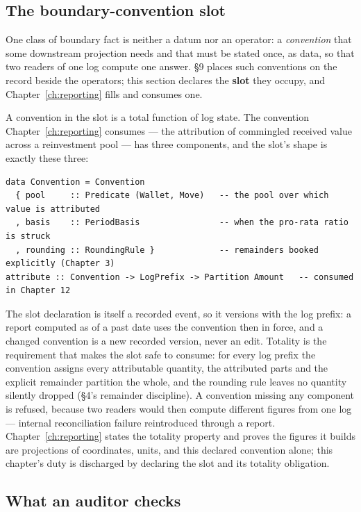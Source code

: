 \subsection{The boundary-convention slot}\label{sec:slot}

One class of boundary fact is neither a datum nor an operator: a \emph{convention} that
some downstream projection needs and that must be stated once, as data, so that two readers
of one log compute one answer. \S 9 places such conventions on the record beside the
operators; this section declares the \textbf{slot} they occupy, and
Chapter~\ref{ch:reporting} fills and consumes one.

A convention in the slot is a total function of log state. The convention
Chapter~\ref{ch:reporting} consumes --- the attribution of commingled received value across
a reinvestment pool --- has three components, and the slot's shape is exactly these three:

\begin{lstlisting}
data Convention = Convention
  { pool     :: Predicate (Wallet, Move)   -- the pool over which value is attributed
  , basis    :: PeriodBasis                -- when the pro-rata ratio is struck
  , rounding :: RoundingRule }             -- remainders booked explicitly (Chapter 3)
attribute :: Convention -> LogPrefix -> Partition Amount   -- consumed in Chapter 12
\end{lstlisting}

The slot declaration is itself a recorded event, so it versions with the log prefix: a
report computed as of a past date uses the convention then in force, and a changed
convention is a new recorded version, never an edit. Totality is the requirement that makes
the slot safe to consume: for every log prefix the convention assigns every attributable
quantity, the attributed parts and the explicit remainder partition the whole, and the
rounding rule leaves no quantity silently dropped (\S 4's remainder discipline). A
convention missing any component is refused, because two readers would then compute
different figures from one log --- internal reconciliation failure reintroduced through a
report. Chapter~\ref{ch:reporting} states the totality property and proves the figures it
builds are projections of coordinates, units, and this declared convention alone; this
chapter's duty is discharged by declaring the slot and its totality obligation.

\subsection{What an auditor checks}

